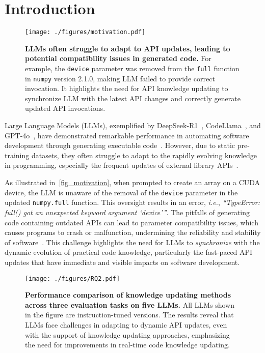 \section{Introduction}
\begin{figure}[!t]
    \centering
    \texttt{[image: ./figures/motivation.pdf]}
    \vspace{-1em}
    \caption{
    \textbf{LLMs often struggle to adapt to API updates, leading to potential compatibility issues in generated code.} For example, the \texttt{device} parameter was removed from the \texttt{full} function in \texttt{numpy} version 2.1.0, making LLM failed to provide correct invocation. It highlights the need for API knowledge updating to synchronize LLM with the latest API changes and correctly generate updated API invocations.
    }
    \label{fig_motivation}
    \vspace{-1em}
\end{figure}
Large Language Models (LLMs), exemplified by DeepSeek-R1~\cite{guo2025deepseekr1}, CodeLlama~\cite{Roziere2023codellama}, and GPT-4o~\cite{openai2024gpt4o}, have demonstrated remarkable performance in automating software development through generating executable code~\cite{Jiang2024code_gen_survey}.
However, due to static pre-training datasets, they often struggle to adapt to the rapidly evolving knowledge in programming, especially the frequent updates of external library APIs~\cite{tao2012code_change, zhang2020python_api_evolve}. 

As illustrated in~\autoref{fig_motivation}, when prompted to create an array on a CUDA device, the LLM is unaware of the removal of the \texttt{device} parameter in the updated \texttt{numpy.full} function.
This oversight results in an error, \emph{i.e.}, \textit{``{TypeError: full() got an unexpected keyword argument `device'}''}.
The pitfalls of generating code containing outdated APIs can lead to parameter compatibility issues, which causes programs to crash or malfunction, undermining the reliability and stability of software~\cite{bai2024apilot, zhang2024pcart}. 
This challenge highlights the need for LLMs to \textit{synchronize} with the dynamic evolution of practical code knowledge, particularly the fast-paced API updates that have immediate and visible impacts on software development.



\begin{figure*}[!t]
	\centering
	\texttt{[image: ./figures/RQ2.pdf]}
         \vspace{-2em}
         \caption{\textbf{Performance comparison of knowledge updating methods across three evaluation tasks on five LLMs.} All LLMs shown in the figure are instruction-tuned versions. The results reveal that LLMs face challenges in adapting to dynamic API updates, even with the support of knowledge updating approaches, emphasizing the need for improvements in real-time code knowledge updating.}
	\label{fig_RQ2}
	\vspace{-1em}
\end{figure*}

